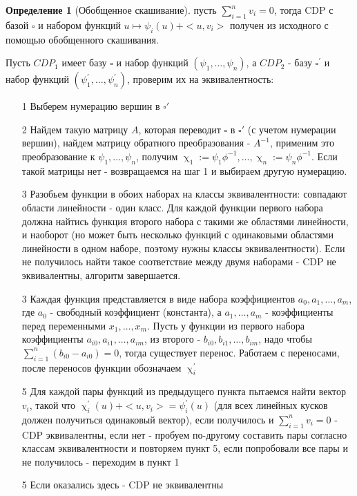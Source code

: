 \documentclass[16pt]{article}
\theoremstyle{definition}
\newtheorem{definition}{Определение}[section]
\begin{document}
\begin{definition}[Обобщенное скашивание]
пусть $\sum_{i=1}^n v_i = 0$, тогда CDP с базой $\square$ и набором функций $u \mapsto \psi_i(u) + <u, v_i>$ получен из исходного с помощью обобщенного скашивания.
\end{definition}
Пусть $CDP_1$ имеет базу $\square$ и набор функций $(\psi_1, \dots, \psi_n)$, а $CDP_2$ - базу $\square^{'}$ и набор функций $(\psi^{'}_1, \dots, \psi^{'}_n)$, проверим их на эквивалентность:
\begin{itemize}
\item[1] Выберем нумерацию вершин в $\square'$
\item[2] Найдем такую матрицу $A$, которая переводит $\square$ в $\square'$ (с учетом нумерации вершин), найдем матрицу обратного преобразования - $A^{-1}$, применим это преобразование к $\psi_1, ..., \psi_n$, получим $\upchi_1 := \psi_1\phi^{-1}, ..., \upchi_n := \psi_n\phi^{-1}$. Если такой матрицы нет - возвращаемся на шаг 1 и выбираем другую нумерацию. 
\item[3] Разобьем функции в обоих наборах на классы эквивалентности: совпадают области линейности - один класс. Для каждой функции первого набора должна найтись функция второго набора с такими же областями линейности, и наоборот (но может быть несколько функций с одинаковыми областями линейности в одном наборе, поэтому нужны классы эквивалентности). Если не получилось найти такое соответствие между двумя наборами - CDP не эквивалентны, алгоритм завершается.
\item[3] Каждая функция представляется в виде набора коэффициентов $a_0, a_1, \dots, a_m$, где $a_0$ - свободный коэффициент (константа), а $a_1, \dots, a_m$ - коэффициенты перед переменными $x_1, \dots, x_m$. Пусть у функции из первого набора коэффициенты $a_{i0}, a_{i1}, \dots, a_{im}$, из второго - $b_{i0}, b_{i1}, \dots, b_{im}$, надо чтобы $\sum_{i=1}^{n}(b_{i0} - a_{i0}) = 0$, тогда существует перенос. 
Работаем с переносами, после переносов функции обозначаем $\upchi^{'}_i$
\item[5] Для каждой пары функций из предыдущего пункта пытаемся найти вектор $v_i$, такой что $\upchi^{'}_i(u) + <u, v_i> = \psi^{'}_i(u)$ (для всех линейных кусков должен получиться одинаковый вектор), если получилось и $\sum_{i=1}^n v_i = 0$ - CDP эквивалентны, если нет - пробуем по-другому составить пары согласно классам эквивалентности и повторяем пункт 5, если попробовали все пары и не получилось - переходим в пункт 1
\item[5] Если оказались здесь - CDP не эквивалентны

\end{itemize}
\end{document}

